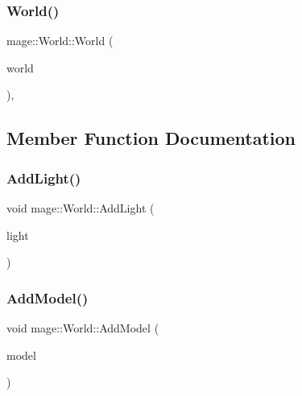 \hypertarget{classmage_1_1_world_a28e20e33499cd57282cefa5ab0fda041}{}\label{classmage_1_1_world_a28e20e33499cd57282cefa5ab0fda041} 
\subsubsection{\texorpdfstring{World()}{World()}\hspace{0.1cm}{\footnotesize\ttfamily [2/2]}}
{\footnotesize\ttfamily mage\+::\+World\+::\+World (\begin{DoxyParamCaption}\item[{const \hyperlink{classmage_1_1_world}{World} \&}]{world }\end{DoxyParamCaption})\hspace{0.3cm}{\ttfamily [private]}, {\ttfamily [delete]}}



\subsection{Member Function Documentation}
\hypertarget{classmage_1_1_world_ab0c31d3113ea264fed8b8ef034047c91}{}\label{classmage_1_1_world_ab0c31d3113ea264fed8b8ef034047c91} 
\subsubsection{\texorpdfstring{Add\+Light()}{AddLight()}}
{\footnotesize\ttfamily void mage\+::\+World\+::\+Add\+Light (\begin{DoxyParamCaption}\item[{\hyperlink{namespacemage_a1e01ae66713838a7a67d30e44c67703e}{Shared\+Ptr}$<$ \hyperlink{classmage_1_1_point_light}{Point\+Light} $>$}]{light }\end{DoxyParamCaption})}

\hypertarget{classmage_1_1_world_a4b7287a11ff316b029ec7727ed0d076d}{}\label{classmage_1_1_world_a4b7287a11ff316b029ec7727ed0d076d} 
\subsubsection{\texorpdfstring{Add\+Model()}{AddModel()}}
{\footnotesize\ttfamily void mage\+::\+World\+::\+Add\+Model (\begin{DoxyParamCaption}\item[{\hyperlink{namespacemage_a1e01ae66713838a7a67d30e44c67703e}{Shared\+Ptr}$<$ \hyperlink{classmage_1_1_model}{Model} $>$}]{model }\end{DoxyParamCaption})}


